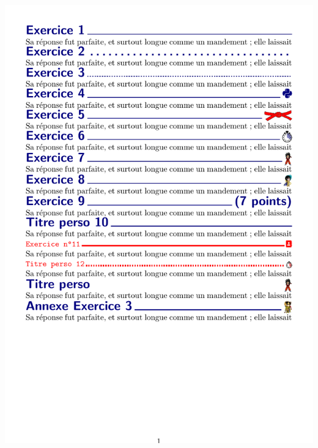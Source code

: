 \documentclass[french,11pt,a4paper]{article}
\begin{document}
\pagebreak

\begin{DemoCode}{}
\includegraphics{envtexo_exemples.pdf}
\end{DemoCode}
\end{document}
